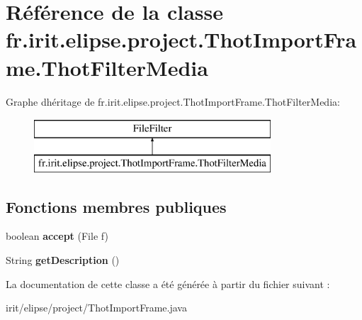 \hypertarget{classfr_1_1irit_1_1elipse_1_1project_1_1_thot_import_frame_1_1_thot_filter_media}{}\section{Référence de la classe fr.\+irit.\+elipse.\+project.\+Thot\+Import\+Frame.\+Thot\+Filter\+Media}
\label{classfr_1_1irit_1_1elipse_1_1project_1_1_thot_import_frame_1_1_thot_filter_media}
Graphe d\textquotesingle{}héritage de fr.\+irit.\+elipse.\+project.\+Thot\+Import\+Frame.\+Thot\+Filter\+Media\+:\begin{figure}[H]
\begin{center}
\leavevmode
\includegraphics[height=2.000000cm]{classfr_1_1irit_1_1elipse_1_1project_1_1_thot_import_frame_1_1_thot_filter_media}
\end{center}
\end{figure}
\subsection*{Fonctions membres publiques}
\begin{DoxyCompactItemize}
\item 
\mbox{\label{classfr_1_1irit_1_1elipse_1_1project_1_1_thot_import_frame_1_1_thot_filter_media_a237890e79159387542db865d4ccf45b8}} 
boolean {\bfseries accept} (File f)
\item 
\mbox{\label{classfr_1_1irit_1_1elipse_1_1project_1_1_thot_import_frame_1_1_thot_filter_media_a3a417ff09ede16dbd65be72610823881}} 
String {\bfseries get\+Description} ()
\end{DoxyCompactItemize}


La documentation de cette classe a été générée à partir du fichier suivant \+:\begin{DoxyCompactItemize}
\item 
irit/elipse/project/Thot\+Import\+Frame.\+java\end{DoxyCompactItemize}
